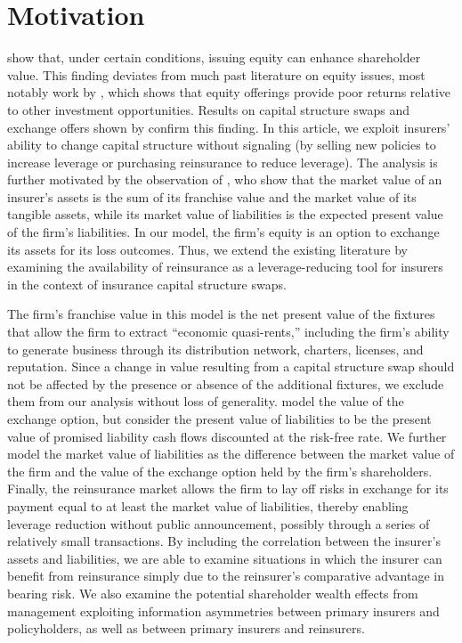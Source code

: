 \section{Motivation}\label{sec:motivation}

\citet{obrien2007a} show that, under certain conditions, issuing equity can enhance shareholder value. This finding deviates from much past literature on equity issues, most notably work by \citet{loughran1995a}, which shows that equity offerings provide poor returns relative to other investment opportunities. Results on capital structure swaps and exchange offers shown by \citet{masulis1980a} confirm this finding.  In this article, we exploit insurers' ability to change capital structure without signaling (by selling new policies to increase leverage or purchasing reinsurance to reduce leverage). The analysis is further motivated by the observation of \citet{babbel2005a}, who show that the market value of an insurer's assets is the sum of its franchise value and the market value of its tangible assets, while its market value of liabilities is the expected present value of the firm's liabilities. In our model, the firm's equity is an option to exchange its assets for its loss outcomes.  Thus, we extend the existing literature by examining the availability of reinsurance as a leverage-reducing tool for insurers in the context of insurance capital structure swaps.

The firm's franchise value in this model is the net present value of the fixtures that allow the firm to extract ``economic quasi-rents,'' including the firm's ability to generate business through its distribution network, charters, licenses, and reputation. Since a change in value resulting from a capital structure swap should not be affected by the presence or absence of the additional fixtures, we exclude them from our analysis without loss of generality. \citet{babbel2005a} model the value of the exchange option, but consider the present value of liabilities to be the present value of promised liability cash flows discounted at the risk-free rate. We further model the market value of liabilities as the difference between the market value of the firm and the value of the exchange option held by the firm's shareholders. Finally, the reinsurance market allows the firm to lay off risks in exchange for its payment equal to at least the market value of liabilities, thereby enabling leverage reduction without public announcement, possibly through a series of relatively small transactions.  By including the correlation between the insurer's assets and liabilities, we are able to examine situations in which the insurer can benefit from reinsurance simply due to the reinsurer's comparative advantage in bearing risk. We also examine the potential shareholder wealth effects from management exploiting information asymmetries between primary insurers and policyholders, as well as between primary insurers and reinsurers.

